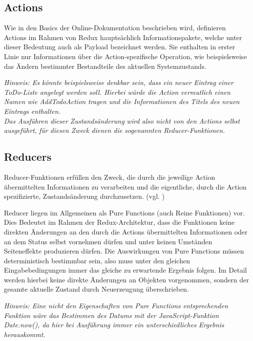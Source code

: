 \documentclass[bibliography=totoc,listof=totoc,BCOR=5mm,DIV=12,oneside]{scrbook}
\begin{document}
\newpage
\subsection{Actions}
\par Wie in den Basics der Online-Dokumentation \citep{ReduxActions} beschrieben wird, definieren Actions im Rahmen von Redux hauptsächlich Informationspakete, welche unter dieser Bedeutung auch als \grqq Payload\grqq{} bezeichnet werden. Sie enthalten in erster Linie nur Informationen über die Action-spezifische Operation, wie beispielsweise das Ändern bestimmter Bestandteile des aktuellen Systemzustands.
\par \bigskip \textit{Hinweis: Es könnte beispielsweise denkbar sein, dass ein neuer Eintrag einer ToDo-Liste angelegt werden soll. Hierbei würde die Action vermutlich einen Namen wie \grqq AddTodoAction\grqq{} tragen und die Informationen des Titels des neuen Eintrags enthalten. \\
Das Ausführen dieser Zustandsänderung wird also nicht von den Actions selbst ausgeführt, für diesen Zweck dienen die sogenannten Reducer-Funktionen.}

\subsection{Reducers}
\par Reducer-Funktionen erfüllen den Zweck, die durch die jeweilige Action übermittelten Informationen zu verarbeiten und die eigentliche, durch die Action spezifizierte, Zustandsänderung durchzusetzen. (vgl. \citep{ReduxReducers})
\par \bigskip Reducer liegen im Allgemeinen als Pure Functions (auch Reine Funktionen) vor. Dies Bedeutet im Rahmen der Redux-Architektur, dass die Funktionen keine direkten Änderungen an den durch die Actions übermittelten Informationen oder an dem Status selbst  vornehmen dürfen und unter keinen Umständen Seiteneffekte produzieren dürfen. Die Auswirkungen von Pure Functions müssen deterministisch bestimmbar sein, also muss unter den gleichen Eingabebedingungen immer das gleiche zu erwartende Ergebnis folgen. Im Detail werden hierbei keine direkte Änderungen an Objekten vorgenommen, sondern der gesamte aktuelle Zustand durch  Neuerzeugung überschrieben.
\par \bigskip \textit{Hinweis: Eine nicht den Eigenschaften von Pure Functions entsprechenden Funktion wäre das Bestimmen des Datums mit der JavaScript-Funktion Date.now(), da hier bei Ausführung immer ein unterschiedliches Ergebnis herauskommt.}
\end{document}

